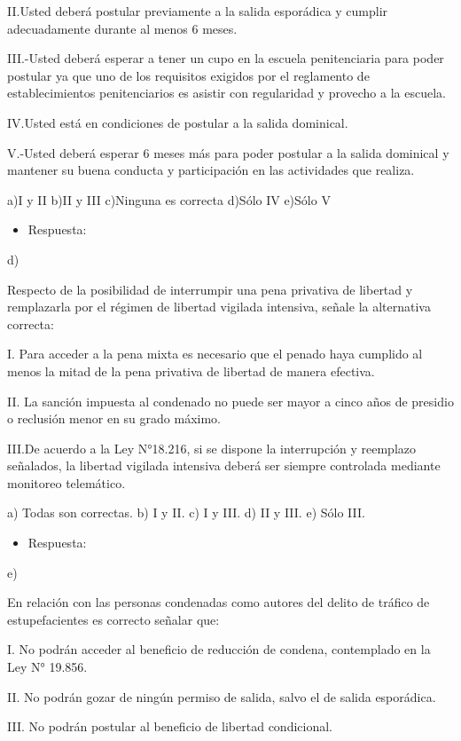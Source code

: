 \documentclass[letterpaper, 11pt]{article}
\begin{document}
II.Usted deberá postular previamente a la salida esporádica y cumplir
adecuadamente durante al menos 6 meses.

III.-Usted deberá esperar a tener un cupo en la escuela penitenciaria para poder
postular ya que uno de los requisitos exigidos por el reglamento de
establecimientos penitenciarios es asistir con regularidad y provecho a la escuela.

IV.Usted está en condiciones de postular a la salida dominical.

V.-Usted deberá esperar 6 meses más para poder postular a la salida dominical y
mantener su buena conducta y participación en las actividades que realiza.

a)I y II
b)II y III
c)Ninguna es correcta
d)Sólo IV
e)Sólo V

\begin{itemize}
\item Respuesta:
\end{itemize}
d)

Respecto de la posibilidad de interrumpir una pena privativa de libertad y
remplazarla por el régimen de libertad vigilada intensiva, señale la alternativa
correcta:

I. Para acceder a la pena mixta es necesario que el penado haya cumplido al menos
la mitad de la pena privativa de libertad de manera efectiva.

II. La sanción impuesta al condenado no puede ser mayor a cinco años de presidio o
reclusión menor en su grado máximo.

III.De acuerdo a la Ley N°18.216, si se dispone la interrupción y reemplazo señalados,
la libertad vigilada intensiva deberá ser siempre controlada mediante monitoreo
telemático.	  

a) Todas son correctas.
b) I y II.
c) I y III.
d) II y III.
e) Sólo III.

\begin{itemize}
\item Respuesta:
\end{itemize}
e)

En relación con las personas condenadas como autores del delito de tráfico de
estupefacientes es correcto señalar que:

I. No podrán acceder al beneficio de reducción de condena, contemplado en la Ley
N° 19.856.

II. No podrán gozar de ningún permiso de salida, salvo el de salida esporádica.

III. No podrán postular al beneficio de libertad condicional.
\end{document}
